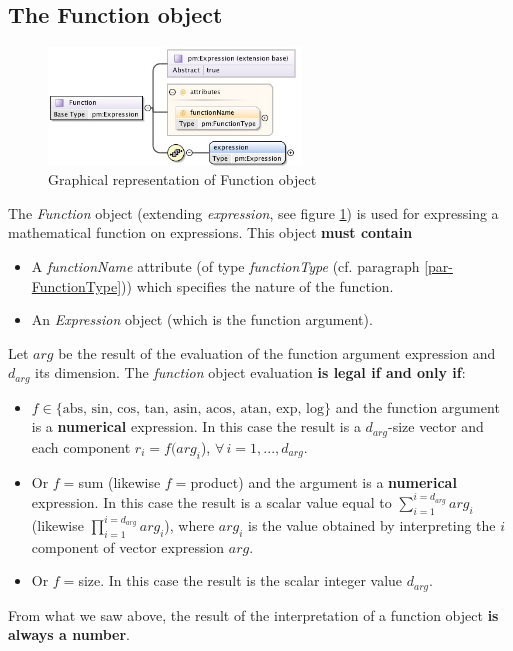 \documentclass[a4paper,11pt] {ivoa}
\begin{document}
\subsection{The Function object}\label{par02_05}
\begin{figure}[htbp]
\begin{center}
\includegraphics[width=0.6\textwidth]{pictures/Function.jpg} 
\caption{Graphical representation of Function object}
\label{Pic-Function}
\end{center}
\end{figure}
The {\it Function} object (extending {\it expression}, see figure \ref{Pic-Function}) is used for
expressing a mathematical function on expressions.
This object {\bf must contain} 
\begin{itemize}
\item A {\it functionName} attribute (of type {\it functionType} (cf. paragraph
\ref{par-FunctionType})) which specifies the nature of the function.
\item An {\it Expression} object (which is the function argument).\\
\end{itemize}
Let $arg$ be the result of the evaluation of the function argument expression and  $d_{arg}$ its
dimension.
The {\it function} object evaluation {\bf is legal if and only if}:
\begin{itemize}
\item $f  \in \{ \mbox{abs, sin, cos, tan, asin, acos, atan, exp, log} \}$ and the function argument
is a {\bf numerical} expression. In this case the  result  is a $d_{arg}$-size vector and each
component  $r_i = f(arg_i$), $\forall \, i=1,...,d_{arg}$.
\item Or $f=$sum (likewise $f=$product) and the argument is a {\bf numerical} expression. In this
case the result is a scalar value equal to $\sum_{i=1}^{i=d_{arg}} arg_i$ (likewise $\prod
_{i=1}^{i=d_{arg}} arg_i$), where $arg_i$ is the value obtained
by interpreting the $i$ component of vector expression $arg$.
\item Or $f=$size. In this case the result is the scalar integer value $d_{arg}$. 
\end{itemize}
From what we saw above, the result of the interpretation of a function object { \bf is always a number}.
\end{document}
